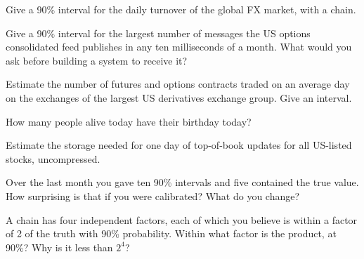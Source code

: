 \begin{interviewq}\label{iq:iv:estimation:4}
Give a 90\% interval for the daily turnover of the global FX market, with a chain.
\end{interviewq}

\begin{interviewq}\label{iq:iv:estimation:5}
Give a 90\% interval for the largest number of messages the US options consolidated feed publishes in any ten
milliseconds of a month. What would you ask before building a system to receive it?
\end{interviewq}

\begin{interviewq}\label{iq:iv:estimation:6}
Estimate the number of futures and options contracts traded on an average day on the exchanges of the largest
US derivatives exchange group. Give an interval.
\end{interviewq}

\begin{interviewq}\label{iq:iv:estimation:7}
How many people alive today have their birthday today?
\end{interviewq}

\begin{interviewq}\label{iq:iv:estimation:8}
Estimate the storage needed for one day of top-of-book updates for all US-listed stocks, uncompressed.
\end{interviewq}

\begin{interviewq}\label{iq:iv:estimation:9}
Over the last month you gave ten 90\% intervals and five contained the true value. How surprising is that if
you were calibrated? What do you change?
\end{interviewq}

\begin{interviewq}\label{iq:iv:estimation:10}
A chain has four independent factors, each of which you believe is within a factor of 2 of the truth with 90\%
probability. Within what factor is the product, at 90\%? Why is it less than $2^4$?
\end{interviewq}

